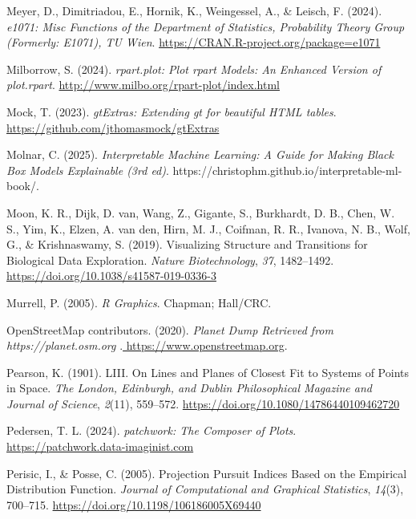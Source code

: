\documentclass[
  letterpaper,
]{krantz}
\newlength{\cslhangindent}
\newenvironment{CSLReferences}[2] %
 {\begin{list}{}{%
  \setlength{\itemindent}{0pt}
  \setlength{\leftmargin}{0pt}
  \setlength{\parsep}{0pt}
  \ifodd #1
   \setlength{\leftmargin}{\cslhangindent}
   \setlength{\itemindent}{-1\cslhangindent}
  \fi
  \setlength{\itemsep}{#2\baselineskip}}}
 {\end{list}}
\begin{document}
\begin{CSLReferences}{1}{0}
Meyer, D., Dimitriadou, E., Hornik, K., Weingessel, A., \& Leisch, F.
(2024). \emph{{e1071}: {M}isc {F}unctions of the {D}epartment of
{S}tatistics, {P}robability {T}heory {G}roup ({F}ormerly: {E1071}), {TU
Wien}}. \url{https://CRAN.R-project.org/package=e1071}

Milborrow, S. (2024). \emph{{rpart.plot}: {P}lot {rpart} {M}odels: {A}n
{E}nhanced {V}ersion of {plot.rpart}}.
\url{http://www.milbo.org/rpart-plot/index.html}

Mock, T. (2023). \emph{gtExtras: Extending gt for beautiful HTML
tables}. \url{https://github.com/jthomasmock/gtExtras}

Molnar, C. (2025). \emph{Interpretable {M}achine {L}earning: A {G}uide
for {M}aking {B}lack {B}ox {M}odels {E}xplainable (3rd ed)}.
https://christophm.github.io/interpretable-ml-book/.

Moon, K. R., Dijk, D. van, Wang, Z., Gigante, S., Burkhardt, D. B.,
Chen, W. S., Yim, K., Elzen, A. van den, Hirn, M. J., Coifman, R. R.,
Ivanova, N. B., Wolf, G., \& Krishnaswamy, S. (2019). Visualizing
{S}tructure and {T}ransitions for {B}iological {D}ata {E}xploration.
\emph{Nature Biotechnology}, \emph{37}, 1482--1492.
\url{https://doi.org/10.1038/s41587-019-0336-3}

Murrell, P. (2005). \emph{R {G}raphics}. Chapman; Hall/CRC.

OpenStreetMap contributors. (2020). \emph{{Planet Dump Retrieved from
https://planet.osm.org
}}.\href{\%20https://www.openstreetmap.org\%20}{ https://www.openstreetmap.org}.

Pearson, K. (1901). LIII. On {L}ines and {P}lanes of {C}losest {F}it to
{S}ystems of {P}oints in {S}pace. \emph{The London, Edinburgh, and
Dublin Philosophical Magazine and Journal of Science}, \emph{2}(11),
559--572. \url{https://doi.org/10.1080/14786440109462720}

Pedersen, T. L. (2024). \emph{{patchwork}: {T}he {C}omposer of {P}lots}.
\url{https://patchwork.data-imaginist.com}

Perisic, I., \& Posse, C. (2005). Projection {P}ursuit {I}ndices {B}ased
on the {E}mpirical {D}istribution {F}unction. \emph{Journal of
Computational and Graphical Statistics}, \emph{14}(3), 700--715.
\url{https://doi.org/10.1198/106186005X69440}


\end{CSLReferences}
\end{document}
